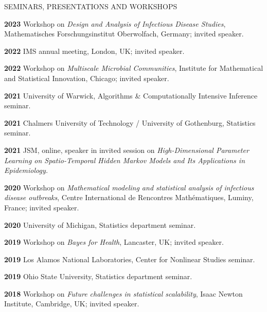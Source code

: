 \begin{mylist}{SEMINARS, PRESENTATIONS AND WORKSHOPS}
  \setlength{\itemsep}{0.15 cm}

 
\item{\bf 2023 }  Workshop on {\it Design and Analysis of Infectious Disease Studies}, Mathematisches Forschungsinstitut Oberwolfach, Germany; invited speaker.
  
\item{\bf 2022} IMS annual meeting, London, UK; invited speaker.
  
\item{\bf 2022} Workshop on {\it Multiscale Microbial Communities}, Institute for Mathematical and Statistical Innovation, Chicago; invited speaker.
  
\item{\bf 2021} University of Warwick, Algorithms \& Computationally Intensive Inference seminar.
               
\item{\bf 2021} Chalmers University of Technology / University of Gothenburg, Statistics seminar.
                 
\item{\bf 2021} JSM, online, speaker in invited session on {\it High-Dimensional Parameter Learning on Spatio-Temporal Hidden Markov Models and Its Applications in Epidemiology.}
                 
\item{\bf 2020 } Workshop on {\it Mathematical modeling and statistical analysis of infectious disease outbreaks}, Centre International de Rencontres Math\'{e}matiques, Luminy, France; invited speaker.

\item{\bf 2020 } University of Michigan, Statistics department seminar.

\item{\bf 2019 } Workshop on {\it Bayes for Health}, Lancaster, UK; invited speaker.

  \item{\bf 2019 } Los Alamos National Laboratories, Center for Nonlinear Studies seminar.
  
  \item{\bf 2019 } Ohio State University, Statistics department seminar.
  
\item{\bf 2018 } Workshop on {\it Future challenges in statistical scalability}, Isaac Newton Institute, Cambridge, UK; invited speaker.


\end{mylist}
